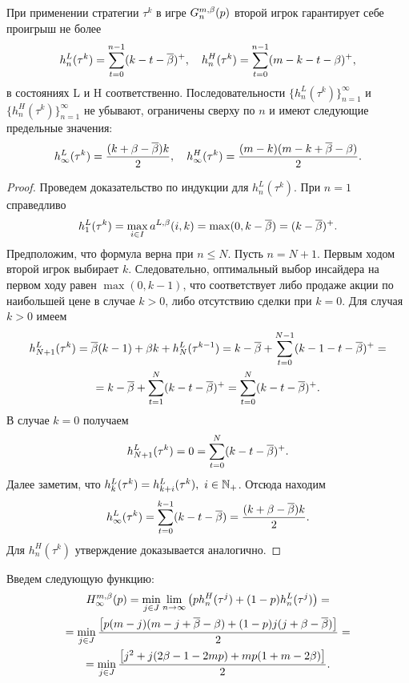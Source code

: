 {\begin{proposition}
  \label{ch1:prop:secondPlayerStrategyPayoffs}
  При применении стратегии $\tau^k$ в игре $\theG*{n}(p)$ второй игрок гарантирует себе проигрыш не более
  \[
    h_n^L(\tau^k) = \sum_{t=0}^{n-1}(k - t - {{\overline{\beta}}})^+, \quad h_n^H(\tau^k) =
    \sum_{t=0}^{n-1}(m - k - t - \beta)^+,
  \]
  в состояниях L и H соответственно.
  Последовательности $\{h_n^L(\tau^k)\}_{n=1}^\infty$ и $\{h_n^H(\tau^k)\}_{n=1}^\infty$ не убывают, ограничены сверху по $n$ и имеют следующие предельные значения:
  \begin{equation*}
    h_\infty^L(\tau^k) = \frac{(k+\beta-{{\overline{\beta}}})k}{2},\quad
    h_\infty^H(\tau^k) = \frac{(m - k)(m - k + {{\overline{\beta}}} - \beta)}{2}.
  \end{equation*}
\end{proposition}
\begin{proof}
  Проведем доказательство по индукции для $h^L_n(\tau^k)$.
  При $n=1$ справедливо
  \[
    h^L_1(\tau^k) = \max_{i \in I} \as[L](i, k) = \max(0, k - \DCo) = (k - \DCo)^+.
  \]
  Предположим, что формула верна при $n \leq N$.
  Пусть $n=N+1$.
  Первым ходом второй игрок выбирает $k$.
  Следовательно, оптимальный выбор инсайдера на первом ходу равен $\max(0, k - 1)$, что соответствует либо продаже акции по наибольшей цене в случае $k > 0$, либо отсутствию сделки при $k=0$. 
  Для случая $k > 0$ имеем
  \begin{gather*}
    h^L_{N+1}(\tau^k) = {{\overline{\beta}}} (k-1) + \beta k + h^L_N(\tau^{k-1}) =
    k - {{\overline{\beta}}} + \sum_{t=0}^{N-1}(k - 1 - t - {{\overline{\beta}}})^+ = \\
    = k - {{\overline{\beta}}} + \sum_{t=1}^N(k-t-{{\overline{\beta}}})^+ = \sum_{t=0}^N(k-t-{{\overline{\beta}}})^+.
  \end{gather*}
  В случае $k = 0$ получаем
  \begin{gather*}
    h^L_{N+1}(\tau^k) = 0 = \sum_{t=0}^N(k-t-{{\overline{\beta}}})^+.
  \end{gather*}
  Далее заметим, что $h^L_k(\tau^k) = h^L_{k+i}(\tau^k),\ i \in \mathbb{N}_+$.
  Отсюда находим
  \begin{equation*}
    h_\infty^L(\tau^k) = \sum_{t=0}^{k-1} (k - t - {{\overline{\beta}}}) = \frac{(k+\beta-{{\overline{\beta}}})k}{2}.
  \end{equation*}
  Для $h^H_n(\tau^k)$ утверждение доказывается аналогично.
\end{proof}

Введем следующую функцию:
\begin{multline*}
  \H*{\infty}(p) 
  = \min_{j \in J} \lim_{n \rightarrow \infty}\left(
    ph_n^H(\tau^j) + (1-p)h_n^L(\tau^j)
  \right) = \\
  = \min_{j \in J} \frac{\left[ p (m - j)(m - j + \DCo - \Co) + (1 - p)j(j + \Co - \DCo) \right]}{2} = \\
  = \min_{j \in J} \frac{\left[ j^2 + j(2\Co - 1 - 2 m p) + m p (1 + m - 2\Co) \right]}{2}.
\end{multline*}

}

